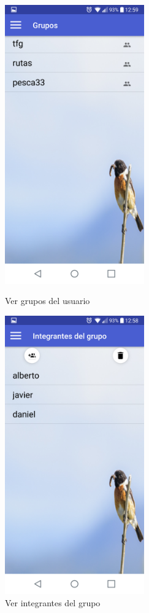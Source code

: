 \begin{figure}[htbp]
\begin{minipage}[b]{0.5\linewidth} %
\centering
\includegraphics[width=6cm]{capturamovil/vergrupos.png}
\caption{Ver grupos del usuario}
 \label{fig:vergrupos}

\end{minipage}
\hspace{0.5cm} %
\begin{minipage}[b]{0.5\linewidth}
\centering
\includegraphics[width=6cm]{capturamovil/verintegrantes.png}
\caption{Ver integrantes del grupo }
 \label{fig:verintegrantes}

\end{minipage}
\end{figure}
\newpage

